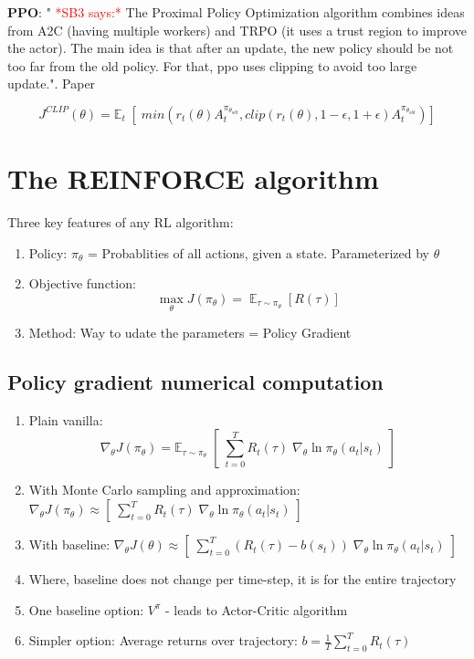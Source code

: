 \documentclass[a4paper, 12pt]{article}
\begin{document}
\textbf{PPO}: " \textcolor{red}{*SB3 says:*} The Proximal Policy Optimization algorithm combines ideas from A2C (having multiple workers) and TRPO (it uses a trust region to improve the actor). The main idea is that after an update, the new policy should be not too far from the old policy. For that, ppo uses clipping to avoid too large update.". Paper \citep{PPO-schulman2017}


\begin{equation}
	J^{CLIP} (\theta) = \mathbb{E}_t \; [ \; min (r_t(\theta) A^{\pi_{\theta_{old}}}_t, clip(r_t(\theta), 1-\epsilon, 1+\epsilon) A^{\pi_{\theta_{old}}}_t)]
	\label{eq:PPO}
\end{equation}

\section{The REINFORCE algorithm}
Three key features of any RL algorithm:
\begin{enumerate}
	\item Policy: $\pi_\theta$ = Probablities of all actions, given a state. Parameterized by $\theta$
	\item Objective function:
	\begin{equation}
		\max_{\theta} J(\pi_{\theta}) = \mathop{\mathbb{E}}_{\tau \sim \pi_\theta} [R(\tau)]
	\end{equation}
	\item Method: Way to udate the parameters = Policy Gradient

\end{enumerate}

\subsection{Policy gradient numerical computation}

\begin{enumerate}
	\item Plain vanilla: 
	\begin{equation}
		\nabla_ \theta J(\pi_\theta) = \mathbb{E}_{\tau \sim \pi_\theta} \; [ \; \sum_{t=0}^T R_t(\tau) \; \nabla_\theta \ln \pi_\theta(a_t \vert s_t) \;]
	\end{equation}
	\item With Monte Carlo sampling and approximation: $\nabla_\theta J(\pi_\theta) \approx [ \; \sum_{t=0}^T R_t(\tau) \; \nabla_\theta \ln \pi_\theta(a_t \vert s_t) \;]$
	\item With baseline: $\nabla_\theta J(\theta) \approx [ \; \sum_{t=0}^T (R_t(\tau) - b(s_t)) \; \nabla_\theta \ln \pi_\theta(a_t \vert s_t) \;]$
	\item Where, baseline does not change per time-step, it is for the entire trajectory
	\item One baseline option: $V^\pi$ - leads to Actor-Critic algorithm
	\item Simpler option: Average returns over trajectory: $b = \frac{1}{T}\sum_{t=0}^T R_t(\tau) $
\end{enumerate}
\end{document}

